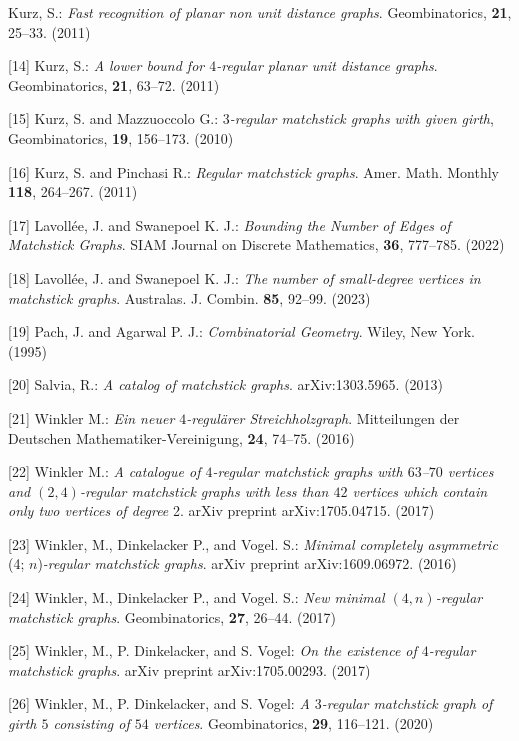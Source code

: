 \documentclass{article}
\begin{document}
\begin{hangpars}
[13] Kurz, S.: \textit{Fast recognition of planar non unit distance graphs}. Geombinatorics, \textbf{21}, 25–33. (2011)

[14] Kurz, S.: \textit{A lower bound for $4$-regular planar unit distance graphs}. Geombinatorics, \textbf{21}, 63–72. (2011)

[15] Kurz, S. and Mazzuoccolo G.: 3\textit{-regular matchstick graphs with given girth}, Geombinatorics, \textbf{19}, 156–173. (2010)

[16] Kurz, S. and Pinchasi R.: \textit{Regular matchstick graphs}. Amer. Math. Monthly \textbf{118}, 264–267. (2011)

[17] Lavollée, J. and Swanepoel K. J.: \textit{Bounding the Number of Edges of Matchstick Graphs}. SIAM Journal on Discrete Mathematics, \textbf{36}, 777–785. (2022)

[18] Lavollée, J. and Swanepoel K. J.: \textit{The number of small-degree vertices in matchstick graphs}. Australas. J. Combin. \textbf{85}, 92–99. (2023)

[19] Pach, J. and Agarwal P. J.: \textit{Combinatorial Geometry}. Wiley, New York. (1995)

[20] Salvia, R.: \textit{A catalog of matchstick graphs}. arXiv:1303.5965. (2013)

[21] Winkler M.: \textit{Ein neuer $4$-regulärer Streichholzgraph}. Mitteilungen der Deutschen Mathematiker-Vereinigung, \textbf{24}, 74–75. (2016)

[22] Winkler M.: \textit{A catalogue of $4$-regular matchstick graphs with $63$–$70$ vertices and $(2, 4)$-regular matchstick graphs with less than $42$ vertices which contain only two vertices of degree} 2. arXiv preprint arXiv:1705.04715. (2017)

[23] Winkler, M., Dinkelacker P., and Vogel. S.: \textit{Minimal completely asymmetric} (4; $n$)\textit{-regular matchstick graphs}. arXiv preprint arXiv:1609.06972. (2016)

[24] Winkler, M., Dinkelacker P., and Vogel. S.: \textit{New minimal $(4, n)$-regular matchstick graphs}. Geombinatorics, \textbf{27}, 26–44. (2017)

[25] Winkler, M., P. Dinkelacker, and S. Vogel: \textit{On the existence of $4$-regular matchstick graphs}. arXiv preprint arXiv:1705.00293. (2017)

[26] Winkler, M., P. Dinkelacker, and S. Vogel: \textit{A $3$-regular matchstick graph of girth $5$ consisting of $54$ vertices}. Geombinatorics, \textbf{29}, 116–121. (2020)

\end{hangpars}
\end{document}
